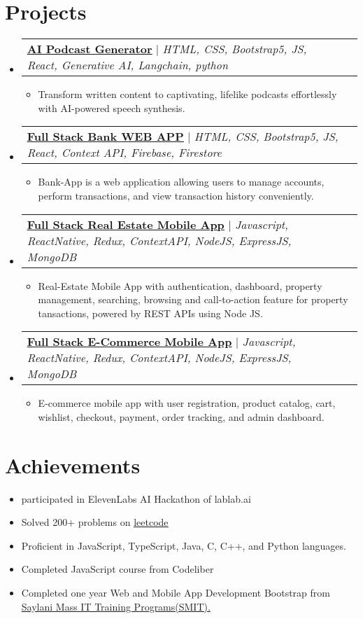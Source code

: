 \documentclass[letterpaper,11pt]{article}
\makeatletter
\newcommand{\resumeItem}[1]{
  \item\small{
    {#1 \vspace{-2pt}}
  }
}
\newcommand{\resumeProjectHeading}[2]{
    \item
    \begin{tabular*}{0.97\textwidth}{l@{\extracolsep{\fill}}r}
      \small#1 & #2 \\
    \end{tabular*}\vspace{-7pt}
}
\newcommand{\resumeSubHeadingListStart}{\begin{itemize}[leftmargin=0.15in, label={}]}
\newcommand{\resumeSubHeadingListEnd}{\end{itemize}}
\newcommand{\resumeItemListStart}{\begin{itemize}}
\newcommand{\resumeItemListEnd}{\end{itemize}\vspace{-5pt}}
\makeatother
\begin{document}
\section{Projects}
    \resumeSubHeadingListStart
      \resumeProjectHeading
          {\textbf{\href{https://github.com/Louvivien/AIpodcastgenerator}{\underline{AI Podcast Generator}}} $|$ \emph{HTML, CSS, Bootstrap5, JS, React, Generative AI, Langchain, python}}{}
          \resumeItemListStart
            \resumeItem{Transform written content to captivating, lifelike podcasts effortlessly with AI-powered speech synthesis.}
          \resumeItemListEnd
      \resumeProjectHeading
          {\textbf{\href{https://github.com/Ahmadjajja/React_Bank}{\underline{Full Stack Bank WEB APP}}} $|$ \emph{HTML, CSS, Bootstrap5, JS, React, Context API, Firebase, Firestore}}{}
          \resumeItemListStart
            \resumeItem{Bank-App is a web application allowing users to manage accounts, perform
            transactions, and view transaction history conveniently.}
          \resumeItemListEnd
      \resumeProjectHeading
          {\textbf{\href{https://github.com/Ahmadjajja/Social_Real_Estate_System_Mobile_App_Frontend}{\underline{Full Stack Real Estate Mobile App}}} $|$ \emph{Javascript, ReactNative, Redux, ContextAPI, NodeJS,
          ExpressJS, MongoDB}}{}
          \resumeItemListStart
            \resumeItem{Real-Estate Mobile App with authentication, dashboard, property
            management, searching, browsing and call-to-action feature for property
            tansactions, powered by REST APIs using Node JS.}
          \resumeItemListEnd
      \resumeProjectHeading
          {\textbf{\href{https://github.com/Ahmadjajja/E_Commerce_Mobile_App_Frontend}{\underline{Full Stack E-Commerce Mobile App}}} $|$ \emph{Javascript, ReactNative, Redux, ContextAPI, NodeJS,
          ExpressJS, MongoDB}}{}
          \resumeItemListStart
            \resumeItem{E-commerce mobile app with user registration, product catalog, cart, wishlist,
            checkout, payment, order tracking, and admin dashboard.}
          \resumeItemListEnd
    \resumeSubHeadingListEnd

\section{Achievements}
          \resumeItemListStart
            \resumeItem{participated in ElevenLabs AI Hackathon of lablab.ai}
            \resumeItem{Solved 200+ problems on {\href{https://leetcode.com/ahmadjajja86/}{\underline{leetcode}}}}
            \resumeItem{Proficient in JavaScript, TypeScript, Java, C, C++, and Python languages.}
            \resumeItem{Completed JavaScript course from Codeliber}
            \resumeItem{Completed one year Web and Mobile App Development Bootstrap from
            {\href{https://drive.google.com/file/d/1HAMbxoTU0kpSDj8k-YFjYE14ngWeisZ1/view}{\underline{Saylani Mass IT Training Programs(SMIT).}}}}
          \resumeItemListEnd



\end{document}
